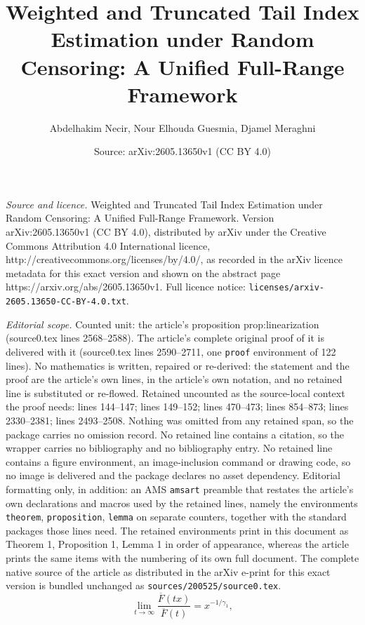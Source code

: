 \documentclass[10pt,a4paper]{amsart}
\title{Weighted and Truncated Tail Index Estimation under Random Censoring: A Unified Full-Range Framework}
\author{Abdelhakim Necir, Nour Elhouda Guesmia, Djamel Meraghni}
\date{Source: arXiv:2605.13650v1 (CC BY 4.0)}
\begin{document}
\maketitle

\noindent\emph{Source and licence.} Weighted and Truncated Tail Index Estimation under Random Censoring: A Unified Full-Range Framework. Version arXiv:2605.13650v1 (CC BY 4.0), distributed by arXiv under the Creative Commons Attribution 4.0 International licence, http://creativecommons.org/licenses/by/4.0/, as recorded in the arXiv licence metadata for this exact version and shown on the abstract page https://arxiv.org/abs/2605.13650v1. Full licence notice: \texttt{licenses/arxiv-2605.13650-CC-BY-4.0.txt}.\par\smallskip

\noindent\textit{Editorial scope.} Counted unit: the article's proposition prop:linearization (source0.tex lines 2568--2588). The article's complete original proof of it is delivered with it (source0.tex lines 2590--2711, one \texttt{proof} environment of 122 lines). No mathematics is written, repaired or re-derived: the statement and the proof are the article's own lines, in the article's own notation, and no retained line is substituted or re-flowed.  Retained uncounted as the source-local context the proof needs: lines 144--147; lines 149--152; lines 470--473; lines 854--873; lines 2330--2381; lines 2493--2508.  Nothing was omitted from any retained span, so the package carries no omission record.  No retained line contains a citation, so the wrapper carries no bibliography and no bibliography entry.  No retained line contains a figure environment, an image-inclusion command or drawing code, so no image is delivered and the package declares no asset dependency.  Editorial formatting only, in addition: an AMS \texttt{amsart} preamble that restates the article's own declarations and macros used by the retained lines, namely the environments \texttt{theorem}, \texttt{proposition}, \texttt{lemma} on separate counters, together with the standard packages those lines need.  The retained environments print in this document as Theorem 1, Proposition 1, Lemma 1 in order of appearance, whereas the article prints the same items with the numbering of its own full document.  The complete native source of the article as distributed in the arXiv e-print for this exact version is bundled unchanged as \texttt{sources/200525/source0.tex}.
\begin{equation}
\lim_{t\rightarrow\infty} \frac{\overline{F}(tx)}{\overline{F}(t)} =
x^{-1/\gamma_{1}}, \label{RVF}%
\end{equation}
\end{document}
